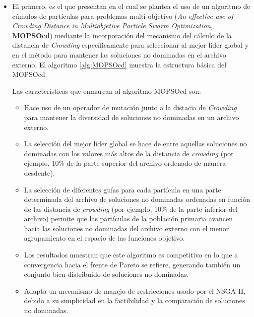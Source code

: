   \begin{itemize}
   \item El primero, es el que presentan \cite{Raquel2005} en el cual se 
  plantea el uso de un algoritmo de c\'umulos de part\'iculas para problemas multi-objetivo (\textit{An effective use of Crowding Distance 
  in Multiobjetive Particle Swarm Optimization}, \textbf{MOPSOcd}) mediante la incorporaci\'on del mecanismo del c\'alculo de la distancia 
  de \textit{Crowding} espec\'ificamente para seleccionar al mejor l\'ider global y en el m\'etodo para mantener las soluciones no dominadas 
  en el archivo externo. El algoritmo \ref{alg:MOPSOcd} muestra la estructura b\'asica del MOPSOcd.
  
  Las caracter\'isticas que enmarcan al algoritmo MOPSOcd son:
  
  \begin{itemize}
   \item Hace uso de un operador de mutaci\'on junto a la distacia de \textit{Crowding} para mantener la 
  diversidad de soluciones no dominadas en un archivo externo.  
  \item La selecci\'on del mejor l\'ider global se hace de entre aquellas soluciones 
  no dominadas con los valores m\'as altos de la distancia de \textit{crowding} (por ejemplo, 10\% de  la parte superior 
  del archivo ordenado de manera desdente). 
  \item La selecci\'on de diferentes gu\'ias para cada part\'icula en una parte determinada del archivo 
  de soluciones no dominadas ordenadas en funci\'on de las distancia de \textit{crowding} 
  (por ejemplo, 10\% de  la parte inferior del archivo)
  permite que las part\'iculas de la poblaci\'on primaria avancen hac\'ia las soluciones no dominadas del archivo externo con el menor 
  agrupamiento en el espacio de las funciones objetivo. 
  \item Los resultados muestran que este algoritmo es competitivo en lo que a 
  convergencia hacia el frente de Pareto se refiere, generando tambi\'en un conjunto bien distribuido de soluciones no dominadas. 
  \item Adapta un mecanismo de manejo de restricciones usado por el NSGA-II, debido a su simplicidad en la factibilidad y la comparaci\'on 
  de soluciones no dominadas.
  \end{itemize}  
 

\end{itemize}
